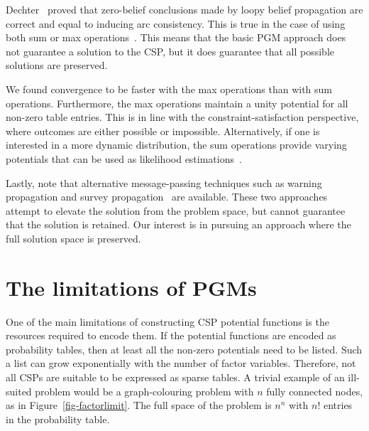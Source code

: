 \documentclass{ieeeaccess}
\begin{document}
Dechter~\cite{dechter2010on} proved that zero-belief conclusions made by loopy belief propagation are correct and equal to inducing arc consistency. This is true in the case of using both sum or max operations~\cite{GoldbergerJ, streicher, dechter2010on}. This means that the basic PGM approach does not guarantee a solution to the CSP, but it does guarantee that all possible solutions are preserved.

We found convergence to be faster with the max operations than with sum operations. Furthermore, the max operations maintain a unity potential for all non-zero table entries. This is in line with the constraint-satisfaction perspective, where outcomes are either possible or impossible. Alternatively, if one is interested in a more dynamic distribution, the sum operations provide varying potentials that can be used as likelihood estimations~\cite{GoldbergerJ}.

Lastly, note that alternative message-passing techniques such as warning propagation and survey propagation~\cite{braunstein2005survey} are available. These two approaches attempt to elevate the solution from the problem space, but cannot guarantee that the solution is retained. Our interest is in pursuing an approach where the full solution space is preserved.


\section{The limitations of PGMs}\label{sec:limitationsofpgms}

One of the main limitations of constructing CSP potential functions is the resources required to encode them. If the potential functions are encoded as probability tables, then at least all the non-zero potentials need to be listed. Such a list can grow exponentially with the number of factor variables. Therefore, not all CSPs are suitable to be expressed as sparse tables. A trivial example of an ill-suited problem would be a graph-colouring problem with $n$ fully connected nodes, as in Figure~\ref{fig-factorlimit}. The full space of the problem is $n^n$ with $n!$ entries in the probability table. 
\end{document}
